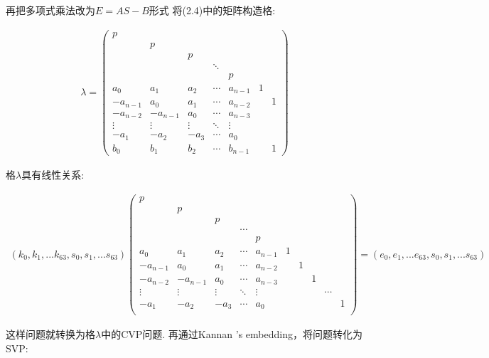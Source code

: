 \documentclass[12pt,a4paper]{article}
\numberwithin{equation}{section}
\begin{document}
再把多项式乘法改为$E=AS-B$形式
将(2.4)中的矩阵构造格:

\begin{align}
	\lambda=
	\left(
	\begin{smallmatrix}
		p        &          &        &        &         &   &   \\
		& p        &        &        &         &   &   \\
		&          & p      &        &         &   &   \\
		&          &        & \ddots &         &   &   \\
		&          &        &        & p       &   &   \\
		a_0      & a_1      & a_2    & \cdots & a_{n-1} & 1 &   \\
		-a_{n-1} & a_0      & a_1    & \cdots & a_{n-2} &   & 1 \\
		-a_{n-2} & -a_{n-1} & a_0    & \cdots & a_{n-3} &   &   \\
		\vdots   & \vdots   & \vdots & \ddots & \vdots  &   &   \\
		-a_1     & -a_2     & -a_3   & \cdots & a_0     &   &   \\
		b_0      & b_1      & b_2    & \cdots & b_{n-1} &   & 1
	\end{smallmatrix}
	\right)
\end{align}

格$\lambda$具有线性关系:

\begin{align}
	(k_0,k_1,...k_{63},s_0,s_1,...s_{63})
	\left(
	\begin{smallmatrix}
			p\\
			&p\\
			&&p\\
			&&&\cdots\\
			&&&&p\\
			a_0    &a_1    &a_2   &\cdots &a_{n-1}            &1\\
			-a_{n-1}&a_0    &a_1   &\cdots &a_{n-2}       &&1\\
			-a_{n-2}&-a_{n-1}&a_0   &\cdots &a_{n-3}  &&&1\\
			\vdots &\vdots &\vdots&\ddots &\vdots             &&&&\cdots\\
			-a_1    &-a_2    &-a_3   &\cdots &a_0 &&&&&1\\
		\end{smallmatrix}
	\right)
	=
	(e_0,e_1,...e_{63},s_0,s_1,...s_{63})
\end{align}

这样问题就转换为格$\lambda$中的CVP问题.
再通过Kannan 's embedding，将问题转化为SVP:
\end{document}
